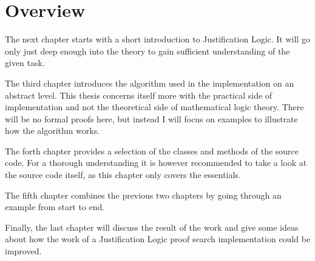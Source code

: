 \section{Overview}
The next chapter starts with a short introduction to Justification Logic. It will go only just deep enough into the theory to gain sufficient understanding of the given task.

The third chapter introduces the algorithm used in the implementation on an abstract level. This thesis concerns itself more with the practical side of implementation and not the theoretical side of mathematical logic theory. There will be no formal proofs here, but instead I will focus on examples to illustrate how the algorithm works.

The forth chapter provides a selection of the classes and methods of the source code. For a thorough understanding it is however recommended to take a look at the source code itself, as this chapter only covers the essentials. 

The fifth chapter combines the previous two chapters by going through an example from start to end.

Finally, the last chapter will discuss the result of the work and give some ideas about how the work of a Justification Logic proof search implementation could be improved.